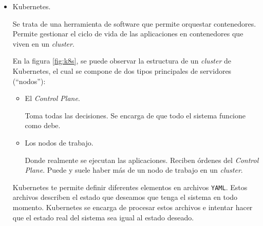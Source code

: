 \begin{itemize}
    \begin{itemize}
      \item Se levantan los tres servicios.
      \item Se les pasarán las variables de entorno indicadas.
      \item Se podrá acceder a ellos a través de los puertos establecidos, siendo el primer número el puerto local y el segundo el puerto del contenedor (\texttt{<local>:<contenedor>}).
      \item Se compartirán los volúmenes mencionados.
    \end{itemize}

    \begin{lstlisting}[language=bash,label=lst:dcup]{Despliegue con Docker Compose}
    docker compose up
    \end{lstlisting}

    Los valores de las variables de entorno, los indicados como \texttt{\$\{variable\}}, se obtienen de un archivo \texttt{.env}, el cual debe estar presente en el mismo directo que el archivo de configuración. En otro caso, es posible indicar la ruta al archivo mediante el campo \texttt{env\_file}, dentro de cada uno de los servicios configurados.

  \item Kubernetes. \label{tech:k8s}

    Se trata de una herramienta de software que permite orquestar contenedores. Permite gestionar el ciclo de vida de las aplicaciones en contenedores que viven en un \textit{cluster}.

    En la figura \ref{fig:k8s}, se puede observar la estructura de un \textit{cluster} de Kubernetes, el cual se compone de dos tipos principales de servidores (``nodos''):

    \begin{itemize}
      \item El \textit{Control Plane}.

        Toma todas las decisiones. Se encarga de que todo el sistema funcione como debe.

      \item Los nodos de trabajo.

        Donde realmente se ejecutan las aplicaciones. Reciben órdenes del \textit{Control Plane}. Puede y suele haber más de un nodo de trabajo en un \textit{cluster}.
    \end{itemize}

    Kubernetes te permite definir diferentes elementos en archivos \texttt{YAML}. Estos archivos describen el estado que deseamos que tenga el sistema en todo momento. Kubernetes se encarga de procesar estos archivos e intentar hacer que el estado real del sistema sea igual al estado deseado.


\end{itemize}

